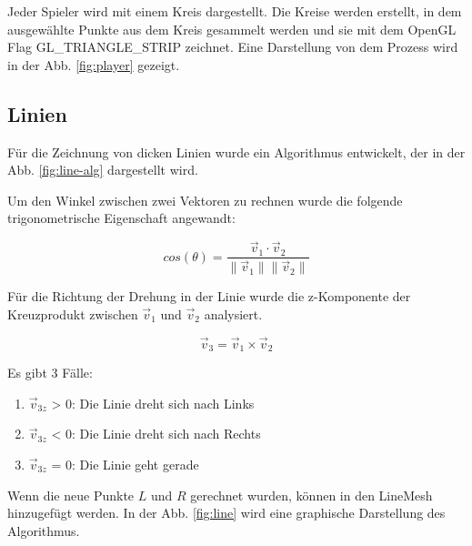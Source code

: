 \documentclass[doktyp=studarbeit]{TUBAFarbeiten}
\begin{document}
Jeder Spieler wird mit einem Kreis dargestellt. Die Kreise werden erstellt, in
dem ausgewählte Punkte aus dem Kreis gesammelt werden und sie mit dem 
OpenGL Flag GL\_TRIANGLE\_STRIP zeichnet. Eine Darstellung von dem Prozess
wird in der Abb. \ref{fig:player} gezeigt.

\FloatBarrier
\subsection{Linien}

Für die Zeichnung von dicken Linien wurde ein Algorithmus entwickelt, der
in der Abb. \ref{fig:line-alg} dargestellt wird. 

Um den Winkel zwischen zwei Vektoren zu rechnen wurde die folgende 
trigonometrische Eigenschaft angewandt:

\begin{equation}
    cos(\theta)=
    \frac{\vec{v}_{1} \cdot \vec{v}_{2}}{
        \lVert \vec{v}_{1} \rVert 
        \lVert \vec{v}_{2} \rVert
    }
\end{equation}

Für die Richtung der Drehung in der Linie wurde die z-Komponente der
Kreuzprodukt zwischen $\vec{v}_{1}$ und $\vec{v}_{2}$ analysiert.

\begin{equation}
    \vec{v}_{3} = \vec{v}_{1} \times \vec{v}_{2}
\end{equation}

Es gibt 3 Fälle:
\begin{enumerate}
    \item $\vec{v}_{3z}$ > 0: Die Linie dreht sich nach Links
    \item $\vec{v}_{3z}$ < 0: Die Linie dreht sich nach Rechts
    \item $\vec{v}_{3z}$ = 0: Die Linie geht gerade
\end{enumerate}

Wenn die neue Punkte $L$ und $R$ gerechnet wurden, können in den LineMesh
hinzugefügt werden.
In der Abb. \ref{fig:line} wird eine graphische Darstellung des Algorithmus.
\end{document}
